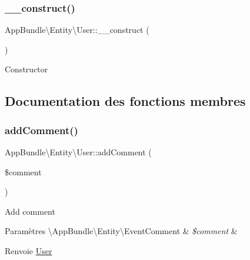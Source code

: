 \subsubsection{\texorpdfstring{\+\_\+\+\_\+construct()}{\_\_construct()}}
{\footnotesize\ttfamily App\+Bundle\textbackslash{}\+Entity\textbackslash{}\+User\+::\+\_\+\+\_\+construct (\begin{DoxyParamCaption}{ }\end{DoxyParamCaption})}

Constructor 

\subsection{Documentation des fonctions membres}
\mbox{\label{classAppBundle_1_1Entity_1_1User_a3368f692f4cbd77041ae379ea82d7d8e}} 
\subsubsection{\texorpdfstring{add\+Comment()}{addComment()}}
{\footnotesize\ttfamily App\+Bundle\textbackslash{}\+Entity\textbackslash{}\+User\+::add\+Comment (\begin{DoxyParamCaption}\item[{\textbackslash{}\hyperlink{classAppBundle_1_1Entity_1_1EventComment}{App\+Bundle\textbackslash{}\+Entity\textbackslash{}\+Event\+Comment}}]{\$comment }\end{DoxyParamCaption})}

Add comment


\begin{DoxyParams}[1]{Paramètres}
\textbackslash{}\+App\+Bundle\textbackslash{}\+Entity\textbackslash{}\+Event\+Comment & {\em \$comment} & \\
\hline
\end{DoxyParams}
\begin{DoxyReturn}{Renvoie}
\hyperlink{classAppBundle_1_1Entity_1_1User}{User} 
\end{DoxyReturn}
\mbox{\label{classAppBundle_1_1Entity_1_1User_ad59ebbe8eb918cc31422beeebbaa9b6c}} 
